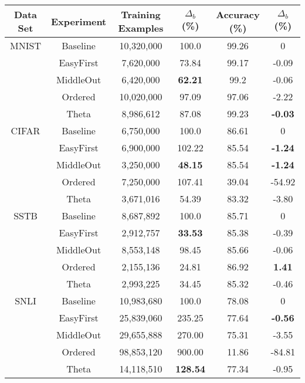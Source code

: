 \documentclass[letterpaper]{article} %
\begin{document}
\begin{table*}[h!]
	\centering 
	\begin{tabular}{cccccc}
		\toprule
		Data Set & Experiment & Training Examples & $\Delta_b$ (\%) & Accuracy (\%) & $\Delta_b$ (\%)\\ 
		\midrule
		MNIST & Baseline & 10,320,000& 100.0&	99.26&	0
		 \\
		 \cmidrule{2-6}
		& EasyFirst & 7,620,000&	73.84&	99.17&	-0.09
		 \\
		& MiddleOut & 6,420,000	&\bf 62.21	&99.2&	-0.06
		 \\
		& Ordered &10,020,000&	97.09&	97.06&	-2.22
		 \\
		& Theta& 8,986,612&	87.08&	99.23&	\bf -0.03
		 \\
		\midrule
		CIFAR & Baseline &  6,750,000& 	100.0&	86.61&	0
		 \\
		 \cmidrule{2-6}
		& EasyFirst & 6,900,000&	102.22&	85.54	&\bf -1.24
		 \\
		& MiddleOut & 3,250,000&	\bf 48.15&	85.54&	\bf -1.24
		 \\
		& Ordered &7,250,000&	107.41&	39.04	&-54.92
		 \\
		& Theta &3,671,016	&54.39&	83.32&	-3.80
		 \\
		\midrule
		SSTB & Baseline &  8,687,892 	&100.0	&85.71&	0
		\\
		\cmidrule{2-6}
		& EasyFirst & 2,912,757	&\bf 33.53&	85.38&	-0.39
		 \\
		& MiddleOut & 8,553,148	&98.45&	85.66&	-0.06
		 \\
		& Ordered & 2,155,136&	24.81&	86.92&	\bf 1.41
		 \\
		& Theta &2,993,225&	34.45&	85.32&	-0.46
		 \\
		\midrule
		SNLI & Baseline &  10,983,680& 	100.0&	78.08&	0
		 \\
		 \cmidrule{2-6}
		& EasyFirst & 25,839,060&	235.25&	77.64& \bf	-0.56
		 \\
		& MiddleOut &29,655,888&	270.00&	75.31&	-3.55
		 \\
		& Ordered & 98,853,120&	900.00&	11.86&	-84.81
		 \\
		& Theta& 14,118,510&	\bf 128.54&	77.34&	-0.95
		 \\
		\bottomrule 
	\end{tabular}
	\label{tab:costs}
\end{table*}
\end{document}
